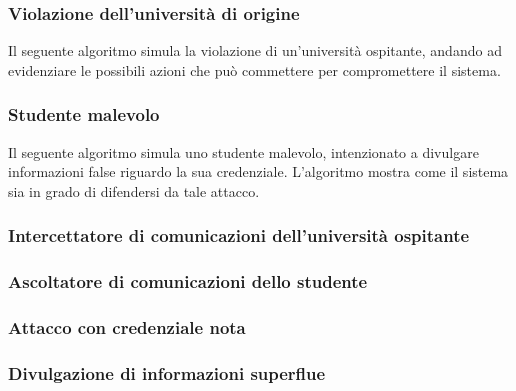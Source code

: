 \documentclass[a4paper,12pt]{article}
\begin{document}
\subsubsection{Violazione dell'università di origine}
Il seguente algoritmo simula la violazione di un'università ospitante, andando ad evidenziare le possibili azioni che può commettere per compromettere il sistema.
\subsubsection{Studente malevolo}
Il seguente algoritmo simula uno studente malevolo, intenzionato a divulgare informazioni false riguardo la sua credenziale. L'algoritmo mostra come il sistema sia in grado di difendersi da tale attacco.
\subsubsection{Intercettatore di comunicazioni dell'università ospitante}
\subsubsection{Ascoltatore di comunicazioni dello studente}
\subsubsection{Attacco con credenziale nota}
\subsubsection{Divulgazione di informazioni superflue}
\end{document}
